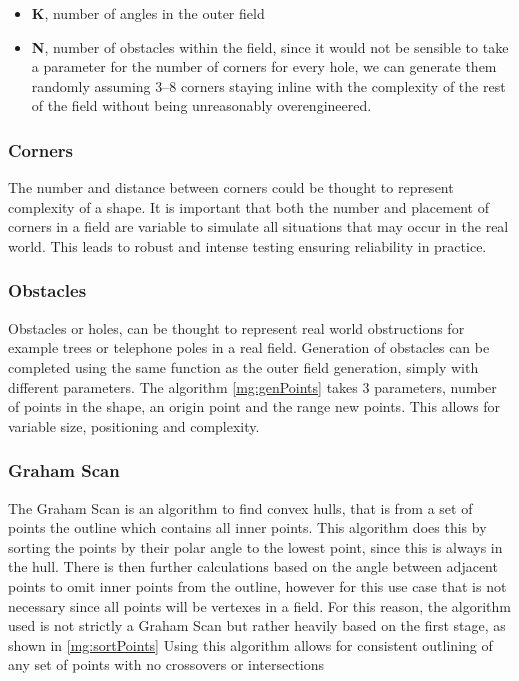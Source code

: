 \documentclass[final]{cmpreport_02}
\begin{document}
\begin{itemize}
	\item \textbf{K}, number of angles in the outer field
	\item \textbf{N}, number of obstacles within the field, since it would not be sensible to take a parameter for the number of corners for every hole, we can generate them randomly assuming 3–8 corners staying inline with the complexity of the rest of the field without being unreasonably overengineered.
\end{itemize}


\subsubsection{Corners}
The number and distance between corners could be thought to represent complexity of a shape.
It is important that both the number and placement of corners in a field are variable to simulate all situations that may occur in the real world.
This leads to robust and intense testing ensuring reliability in practice.


\subsubsection{Obstacles}
Obstacles or holes, can be thought to represent real world obstructions for example trees or telephone poles in a real field.
Generation of obstacles can be completed using the same function as the outer field generation, simply with different parameters.
The algorithm \ref{mg:genPoints} takes 3 parameters, number of points in the shape, an origin point and the range new points.
This allows for variable size, positioning and complexity.


\subsubsection{Graham Scan}
The Graham Scan \citep{graham1972efficient} is an algorithm to find convex hulls, that is from a set of points the outline which contains all inner points.
This algorithm does this by sorting the points by their polar angle to the lowest point, since this is always in the hull.
There is then further calculations based on the angle between adjacent points to omit inner points from the outline, however for this use case that is not necessary since all points will be vertexes in a field.
For this reason, the algorithm used is not strictly a Graham Scan but rather heavily based on the first stage, as shown in \ref{mg:sortPoints}
Using this algorithm allows for consistent outlining of any set of points with no crossovers or intersections
\end{document}
